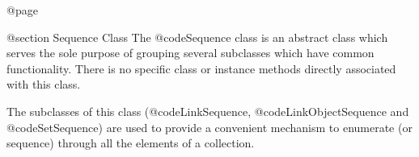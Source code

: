 @page

@section  Sequence Class
The @code{Sequence} class is an abstract class which serves the
sole purpose of grouping several subclasses which have common
functionality.  There is no specific class or instance methods
directly associated with this class.

The subclasses of this class (@code{LinkSequence},
@code{LinkObjectSequence} and @code{SetSequence}) are used to provide a
convenient mechanism to enumerate (or sequence) through all the
elements of a collection.







